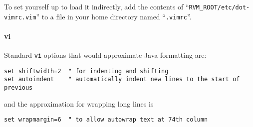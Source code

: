 To set yourself up to load it indirectly, add the contents
of ``\texttt{RVM\_ROOT/etc/dot-vimrc.vim}'' to a file in your home
directory named ``\texttt{.vimrc}''.

\paragraph{vi}\label{options:vi}

Standard {\tt vi} options that would approximate Java\TMweb{} formatting are:

\begin{verbatim}
set shiftwidth=2  " for indenting and shifting
set autoindent    " automatically indent new lines to the start of previous
\end{verbatim}
and the approximation for wrapping long lines is
\begin{verbatim}
set wrapmargin=6  " to allow autowrap text at 74th column
\end{verbatim}


